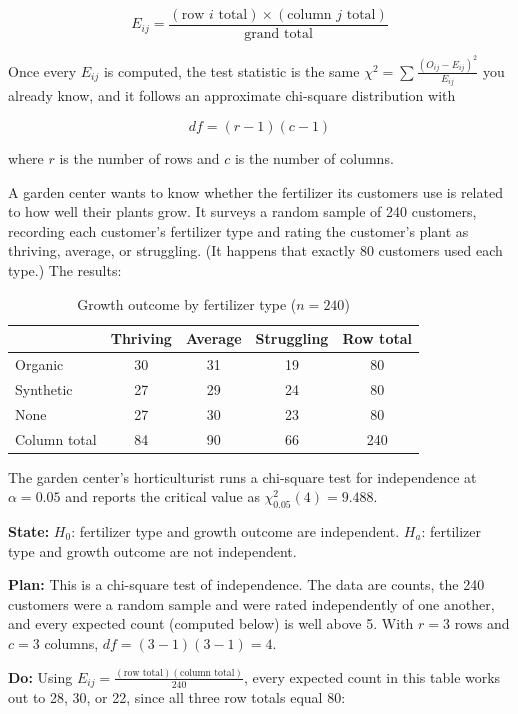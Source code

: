 \[
E_{ij} = \frac{(\text{row } i \text{ total}) \times (\text{column } j \text{ total})}{\text{grand total}}
\]

Once every $E_{ij}$ is computed, the test statistic is the same $\chi^2 = \sum \frac{(O_{ij} - E_{ij})^2}{E_{ij}}$ you already know, and it follows an approximate chi-square distribution with

\[
df = (r - 1)(c - 1)
\]

where $r$ is the number of rows and $c$ is the number of columns.

\begin{Worked}
\begin{Problem}
A garden center wants to know whether the fertilizer its customers use is related to how well their plants grow. It surveys a random sample of 240 customers, recording each customer's fertilizer type and rating the customer's plant as thriving, average, or struggling. (It happens that exactly 80 customers used each type.) The results:

\begin{table}[H]
\centering
\caption{Growth outcome by fertilizer type ($n = 240$)}
\begin{tabular}{l|ccc|c}
 & Thriving & Average & Struggling & Row total \\
\hline
Organic   & 30 & 31 & 19 & 80 \\
Synthetic & 27 & 29 & 24 & 80 \\
None      & 27 & 30 & 23 & 80 \\
\hline
Column total & 84 & 90 & 66 & 240 \\
\end{tabular}
\end{table}

The garden center's horticulturist runs a chi-square test for independence at $\alpha = 0.05$ and reports the critical value as $\chi^2_{0.05}(4) = 9.488$.
\end{Problem}
\begin{Solution}
\textbf{State:} $H_0$: fertilizer type and growth outcome are independent. $H_a$: fertilizer type and growth outcome are not independent.

\textbf{Plan:} This is a chi-square test of independence. The data are counts, the 240 customers were a random sample and were rated independently of one another, and every expected count (computed below) is well above 5. With $r = 3$ rows and $c = 3$ columns, $df = (3-1)(3-1) = 4$.

\textbf{Do:} Using $E_{ij} = \frac{(\text{row total})(\text{column total})}{240}$, every expected count in this table works out to 28, 30, or 22, since all three row totals equal 80:


\end{Solution}
\end{Worked}
